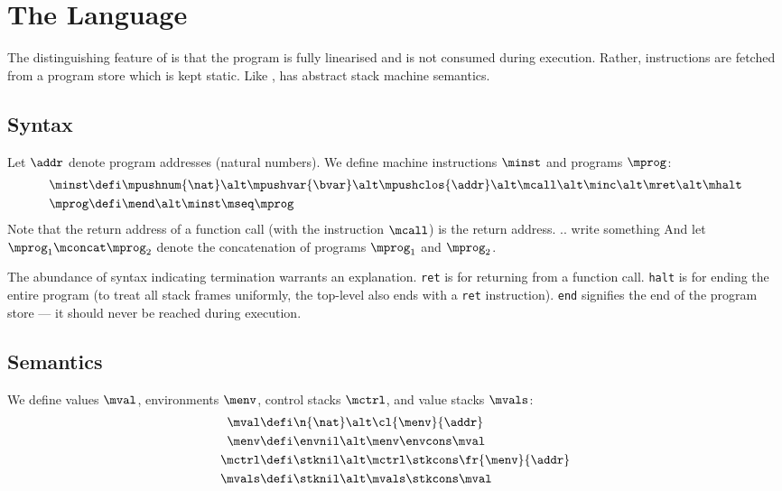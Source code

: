 \section{The \textnormal{\mlang} Language}

The distinguishing feature of \mlang is that the program is fully linearised and is not consumed during execution.
Rather, instructions are fetched from a program store which is kept static.
Like \slang, \mlang has abstract stack machine semantics.

\subsection{Syntax}

Let $\addr$ denote program addresses (natural numbers).
We define machine instructions $\minst$ and programs $\mprog$:
\begin{align*}
  \minst &\defi \mpushnum{\nat} \alt \mpushvar{\bvar} \alt \mpushclos{\addr} \alt \mcall \alt \minc \alt \mret \alt \mhalt \\
  \mprog &\defi \mend \alt \minst \mseq \mprog
\end{align*}
Note that the return address of a function call (with the instruction $\mcall$) is the return address. .. write something
And let $\mprog_1 \mconcat \mprog_2$ denote the concatenation of programs $\mprog_1$ and $\mprog_2$.

The abundance of syntax indicating termination warrants an explanation.
\texttt{ret} is for returning from a function call.
\texttt{halt} is for ending the entire program (to treat all stack frames uniformly, the top-level also ends with a \texttt{ret} instruction).
\texttt{end} signifies the end of the program store --- it should never be reached during execution.


\subsection{Semantics}

We define values $\mval$, environments $\menv$, control stacks $\mctrl$, and value stacks $\mvals$:
\begin{align*}
  \mval &\defi \n{\nat} \alt \cl{\menv}{\addr} \\
  \menv &\defi \envnil \alt \menv \envcons \mval \\
  \mctrl &\defi \stknil \alt \mctrl \stkcons \fr{\menv}{\addr} \\
  \mvals &\defi \stknil \alt \mvals \stkcons \mval
\end{align*}

